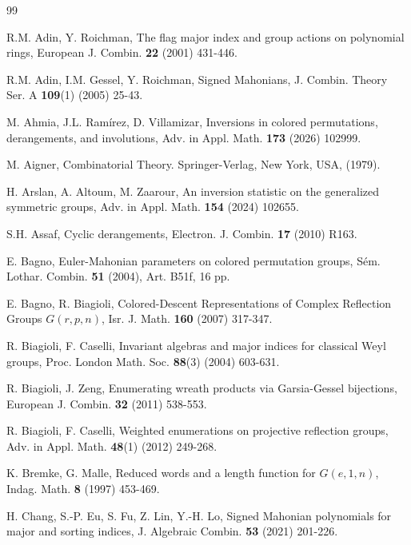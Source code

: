 \documentclass[a4paper,12pt]{article}
\begin{document}
\begin{thebibliography}{99}

 R.M. Adin, Y. Roichman, The flag major index and group actions on polynomial
rings, European J. Combin. \textbf{22} (2001) 431-446.

 R.M. Adin, I.M. Gessel, Y. Roichman,
Signed Mahonians, J. Combin. Theory Ser. A \textbf{109}(1) (2005) 25-43.


 M. Ahmia, J.L. Ram\'irez, D. Villamizar, Inversions in colored permutations, derangements, and involutions, 	Adv. in Appl. Math. \textbf{173} (2026) 102999.

 M. Aigner, Combinatorial Theory. Springer-Verlag, New York, USA, (1979).

 H. Arslan, A. Altoum, M. Zaarour, An inversion statistic on the generalized symmetric groups, Adv. in Appl. Math. \textbf{154} (2024) 102655.

 S.H. Assaf, Cyclic derangements, Electron. J. Combin. \textbf{17} (2010) R163.

 E. Bagno, Euler-Mahonian parameters on colored permutation groups, S\'em. Lothar. Combin. \textbf{51} (2004), Art. B51f, 16 pp.

 E. Bagno, R. Biagioli, Colored-Descent Representations of Complex Reflection Groups $G(r,p,n)$, Isr. J. Math. \textbf{160} (2007) 317-347.

 R. Biagioli, F. Caselli, Invariant algebras and major indices for classical Weyl groups, Proc. London Math. Soc. \textbf{88}(3) (2004) 603-631.

 R. Biagioli, J. Zeng, Enumerating wreath products via Garsia-Gessel bijections, European J. Combin. \textbf{32} (2011) 538-553.

 R. Biagioli, F. Caselli, Weighted enumerations on projective reflection groups, Adv. in Appl. Math. \textbf{48}(1) (2012) 249-268.

 K. Bremke, G. Malle, Reduced words and a length function for $G (e, 1, n)$, Indag. Math. \textbf{8} (1997) 453-469.

 H. Chang, S.-P. Eu, S. Fu, Z. Lin, Y.-H. Lo, Signed Mahonian polynomials for major and sorting indices, J. Algebraic Combin. \textbf{53} (2021) 201-226.


\end{thebibliography}
\end{document}
